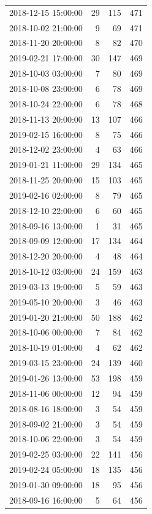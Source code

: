 \begin{tabular}{lrrr}
2018-12-15 15:00:00 & 29 & 115 & 471 \\
2018-10-02 21:00:00 & 9 & 69 & 471 \\
2018-11-20 20:00:00 & 8 & 82 & 470 \\
2019-02-21 17:00:00 & 30 & 147 & 469 \\
2018-10-03 03:00:00 & 7 & 80 & 469 \\
2018-10-08 23:00:00 & 6 & 78 & 469 \\
2018-10-24 22:00:00 & 6 & 78 & 468 \\
2018-11-13 20:00:00 & 13 & 107 & 466 \\
2019-02-15 16:00:00 & 8 & 75 & 466 \\
2018-12-02 23:00:00 & 4 & 63 & 466 \\
2019-01-21 11:00:00 & 29 & 134 & 465 \\
2018-11-25 20:00:00 & 15 & 103 & 465 \\
2019-02-16 02:00:00 & 8 & 79 & 465 \\
2018-12-10 22:00:00 & 6 & 60 & 465 \\
2018-09-16 13:00:00 & 1 & 31 & 465 \\
2018-09-09 12:00:00 & 17 & 134 & 464 \\
2018-12-20 20:00:00 & 4 & 48 & 464 \\
2018-10-12 03:00:00 & 24 & 159 & 463 \\
2019-03-13 19:00:00 & 5 & 59 & 463 \\
2019-05-10 20:00:00 & 3 & 46 & 463 \\
2019-01-20 21:00:00 & 50 & 188 & 462 \\
2018-10-06 00:00:00 & 7 & 84 & 462 \\
2018-10-19 01:00:00 & 4 & 62 & 462 \\
2019-03-15 23:00:00 & 24 & 139 & 460 \\
2019-01-26 13:00:00 & 53 & 198 & 459 \\
2018-11-06 00:00:00 & 12 & 94 & 459 \\
2018-08-16 18:00:00 & 3 & 54 & 459 \\
2018-09-02 21:00:00 & 3 & 54 & 459 \\
2018-10-06 22:00:00 & 3 & 54 & 459 \\
2019-02-25 03:00:00 & 22 & 141 & 456 \\
2019-02-24 05:00:00 & 18 & 135 & 456 \\
2019-01-30 09:00:00 & 18 & 95 & 456 \\
2018-09-16 16:00:00 & 5 & 64 & 456 \\

\end{tabular}
